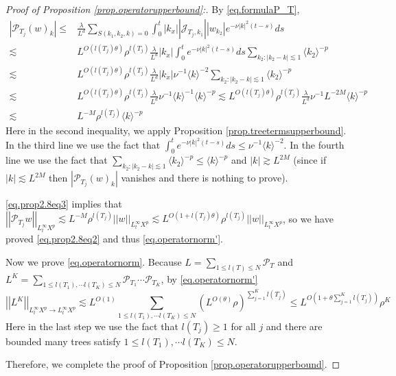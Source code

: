 \begin{proof}[Proof of Proposition \ref{prop.operatorupperbound}:]
By \eqref{eq.formulaP_T},
\begin{equation}\label{eq.prop2.8eq3}
\begin{split}
    |\mathcal{P}_{T_j}(w)_k|\le &\frac{\lambda}{L^{d}} \sum\limits_{S(k_1,k_2,k)=0}\int^{t}_0|k_{x}||\mathcal{J}_{T_j,k_1}| |w_{k_2}|e^{- \nu|k|^2(t-s)} ds
    \\
    \lesssim& L^{O(l(T_j)\theta)} \rho^{l(T_j)}\frac{\lambda}{L^{d}}|k_{x}| \int^{t}_0e^{- \nu|k|^2(t-s)} ds \sum_{k_2:|k_2-k|\lesssim 1} \langle k_2\rangle^{-p} 
    \\
    \lesssim& L^{O(l(T_j)\theta)} \rho^{l(T_j)}\frac{\lambda}{L^{d}} |k_{x}| \nu^{-1} \langle k\rangle^{-2} \sum_{k_2:|k_2-k|\lesssim 1} \langle k_2\rangle^{-p} 
    \\
    \lesssim& L^{O(l(T_j)\theta)} \rho^{l(T_j)}\frac{\lambda}{L^{d}} \nu^{-1} \langle k\rangle^{-1}  \langle k\rangle^{-p} \lesssim L^{O(l(T_j)\theta)} \rho^{l(T_j)}\frac{\lambda}{L^{d}} \nu^{-1} L^{-2M}  \langle k\rangle^{-p} 
    \\
    \lesssim& L^{-M} \rho^{l(T_j)} \langle k\rangle^{-p}
\end{split}
\end{equation} 
Here in the second inequality, we apply Proposition \ref{prop.treetermsupperbound}. In the third line we use the fact that $\int^{t}_0e^{- \nu|k|^2(t-s)} ds\le \nu^{-1} \langle k\rangle^{-2}$. In the fourth line we use the fact that $\sum_{k_2:|k_2-k|\lesssim 1} \langle k_2\rangle^{-p}\le \langle k\rangle^{-p}$ and $|k|\gtrsim L^{2M}$ (since if $|k|\lesssim L^{2M}$ then $|\mathcal{P}_{T_j}(w)_k|$ vanishes and there is nothing to prove).

\eqref{eq.prop2.8eq3} implies that $ \left|\left|\mathcal{P}_{T_j}w\right|\right|_{L_t^{\infty}X^p}\lesssim L^{-M} \rho^{l(T_j)} \left|\left|w\right|\right|_{L_t^{\infty}X^p}\lesssim L^{O(1+l(T_j)\theta)} \rho^{l(T_j)} \left|\left|w\right|\right|_{L_t^{\infty}X^p}$, so we have proved \eqref{eq.prop2.8eq2} and thus \eqref{eq.operatornorm'}.

Now we prove \eqref{eq.operatornorm}. Because $L=\sum_{1\le l(T)\le N} \mathcal{P}_{T}$ and $L^K=\sum_{1\le l(T_1),\cdots l(T_K)\le N} \mathcal{P}_{T_1}\cdots\mathcal{P}_{T_K}$, by \eqref{eq.operatornorm'} 
\begin{equation}
     \left|\left|L^K\right|\right|_{L_t^{\infty}X^p\rightarrow L_t^{\infty}X^p}\lesssim L^{O(1)} \sum_{1\le l(T_1),\cdots l(T_K)\le N} (L^{O(\theta)}\rho)^{\sum_{j=1}^K l(T_j)}\le L^{O\left(1+\theta \sum_{j=1}^K l(T_j)\right)} \rho^{K}
\end{equation}
Here in the last step we use the fact that $l(T_j)\ge 1$ for all $j$ and there are bounded many trees satisfy $1\le l(T_1),\cdots l(T_K)\le N$.

Therefore, we complete the proof of Proposition \ref{prop.operatorupperbound}.
\end{proof}



